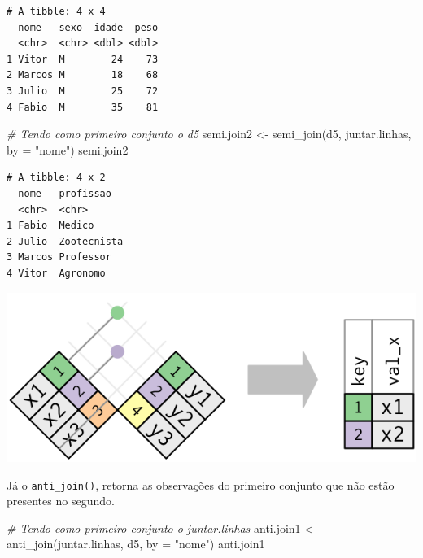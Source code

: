 \documentclass[
  brazilian,
]{book}
\newenvironment{Shaded}{\begin{snugshade}}{\end{snugshade}}
\newcommand{\AttributeTok}[1]{\textcolor[rgb]{0.77,0.63,0.00}{#1}}
\newcommand{\CommentTok}[1]{\textcolor[rgb]{0.56,0.35,0.01}{\textit{#1}}}
\newcommand{\FunctionTok}[1]{\textcolor[rgb]{0.00,0.00,0.00}{#1}}
\newcommand{\NormalTok}[1]{#1}
\newcommand{\OtherTok}[1]{\textcolor[rgb]{0.56,0.35,0.01}{#1}}
\newcommand{\StringTok}[1]{\textcolor[rgb]{0.31,0.60,0.02}{#1}}
\let\origfigure\figure
\let\endorigfigure\endfigure
\renewenvironment{figure}[1][2] {
    \expandafter\origfigure\expandafter[H]
} {
    \endorigfigure
}
\begin{document}
\begin{verbatim}
# A tibble: 4 x 4
  nome   sexo  idade  peso
  <chr>  <chr> <dbl> <dbl>
1 Vitor  M        24    73
2 Marcos M        18    68
3 Julio  M        25    72
4 Fabio  M        35    81
\end{verbatim}

\begin{Shaded}
\begin{Highlighting}[]
\CommentTok{\# Tendo como primeiro conjunto o \textasciigrave{}d5\textasciigrave{}}
\NormalTok{semi.join2 }\OtherTok{\textless{}{-}} \FunctionTok{semi\_join}\NormalTok{(d5, juntar.linhas, }\AttributeTok{by =} \StringTok{"nome"}\NormalTok{)}
\NormalTok{semi.join2}
\end{Highlighting}
\end{Shaded}

\begin{verbatim}
# A tibble: 4 x 2
  nome   profissao  
  <chr>  <chr>      
1 Fabio  Medico     
2 Julio  Zootecnista
3 Marcos Professor  
4 Vitor  Agronomo   
\end{verbatim}

\begin{figure}

{\centering \includegraphics[width=0.5\linewidth]{imagens/join-semi} 

}

\caption{Esquematização da função $semi_join$. Fonte: R for Data Science, 2017.}\label{fig:unnamed-chunk-179}
\end{figure}

Já o \texttt{anti\_join()}, retorna as observações do primeiro conjunto que não estão presentes no segundo.

\begin{Shaded}
\begin{Highlighting}[]
\CommentTok{\# Tendo como primeiro conjunto o \textasciigrave{}juntar.linhas\textasciigrave{}}
\NormalTok{anti.join1 }\OtherTok{\textless{}{-}} \FunctionTok{anti\_join}\NormalTok{(juntar.linhas, d5, }\AttributeTok{by =} \StringTok{"nome"}\NormalTok{)}
\NormalTok{anti.join1}
\end{Highlighting}
\end{Shaded}
\end{document}
